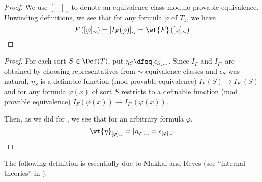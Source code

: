 \documentclass[11pt]{article}
\begin{document}
\begin{proof}
  We use $[ - ]_{\sim}$ to denote an equivalence class modulo provable equivalence. Unwinding definitions, we see that for any formula $\varphi$ of $T_1$, we have
  $$
F\left([\varphi]_{\sim}\right) = \left[ I_F(\varphi)\right]_{\sim} = \wt{F}\left([\varphi]_{\sim}\right)
  $$
\end{proof}


\begin{proof}
  For each sort $S \in \Def(T)$, put $\eta_S \dfeq [\epsilon_S]_{\sim}$. Since $I_F$ and $I_{F'}$ are obtained by choosing representatives from $\sim$-equivalence classes and $\epsilon_S$ was natural, $\eta_S$ is a definable function (mod provable equivalence) $I_F(S) \to I_{F'}(S)$ and for any formula $\varphi(x)$ of sort $S$ restricts to a definable function (mod provable equivalence) $I_F(\varphi(x)) \to I_{F'}(\varphi(x))$.

  Then, as we did for , we see that for an arbitrary formula $\varphi$,
  $$
\wt{\eta}_{[\varphi]_{\sim}} = \left[\eta_{\varphi}\right]_{\sim} = \epsilon_{[\varphi]_{\sim}}.
  $$
  \end{proof}

The following definition is essentially due to Makkai and Reyes (see ``internal theories'' in \cite{makkai-reyes}).
  
\end{document}
